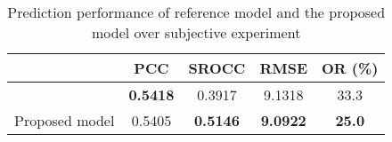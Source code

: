 \begin{table}[tb]
  \caption{Prediction performance of reference model and the proposed model over subjective experiment}
  \centering
  \begin{tabular}{|c|c|c|c|c|}
    \hline
    & PCC & SROCC & RMSE & OR (\%)\\
    \hline
    \cite{CumulativeQoE_Assessing} & \textbf{0.5418} & 0.3917 & 9.1318 & 33.3\\ \hline
    Proposed model & 0.5405 & \textbf{0.5146} & \textbf{9.0922} & \textbf{25.0}\\
    \hline
  \end{tabular}
  \label{tbl:PerformanceExperiment}
\end{table}
